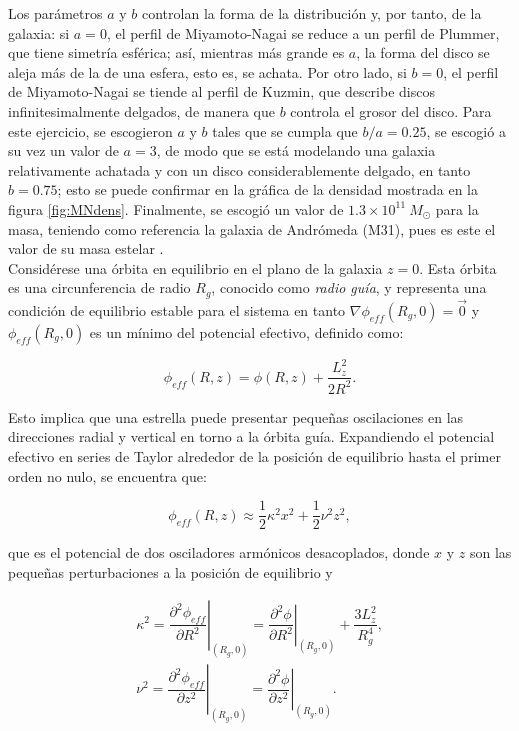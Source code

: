\documentclass[final,5p,times,twocolumn, nopreprintline]{elsarticle}
\numberwithin{equation}{section}
\begin{document}
Los parámetros $a$ y $b$ controlan la forma de la distribución y, por tanto, de la galaxia: si $a=0$, el perfil de Miyamoto-Nagai se reduce a un perfil de Plummer, que tiene simetría esférica; así, mientras más grande es $a$, la forma del disco se aleja más de la de una esfera, esto es, se achata. Por otro lado, si $b=0$, el perfil de Miyamoto-Nagai se tiende al perfil de Kuzmin, que describe discos infinitesimalmente delgados, de manera que $b$ controla el grosor del disco. Para este ejercicio, se escogieron $a$ y $b$ tales que se cumpla que $b/a=0.25$, se escogió a su vez un valor de $a=3$, de modo que se está modelando una galaxia relativamente achatada y con un disco considerablemente delgado, en tanto $b=0.75$; esto se puede confirmar en la gráfica de la densidad mostrada en la figura \ref{fig:MNdens}. Finalmente, se escogió un valor de $1.3\times10^{11}~M_\odot$ para la masa, teniendo como referencia la galaxia de Andrómeda (M31), pues es este el valor de su masa estelar \cite{Corbelli_2010}.\\

Considérese una órbita en equilibrio en el plano de la galaxia $z=0$. Esta órbita es una circunferencia de radio $R_g$, conocido como \emph{radio guía}, y representa una condición de equilibrio estable para el sistema en tanto $\nabla\phi_{eff}(R_g,0)=\vec{0}$ y $\phi_{eff}(R_g,0)$ es un mínimo del potencial efectivo, definido como:

\begin{equation}
\phi_{eff}(R,z)=\phi(R,z)+\dfrac{L_z^2}{2R^2}. \label{eq:poteff}
\end{equation}

Esto implica que una estrella puede presentar pequeñas oscilaciones en las direcciones radial y vertical en torno a la órbita guía. Expandiendo el potencial efectivo en series de Taylor alrededor de la posición de equilibrio hasta el primer orden no nulo, se encuentra que:

\begin{equation}
\phi_{eff}(R,z)\approx \dfrac{1}{2}\kappa^2x^2+\dfrac{1}{2}\nu^2z^2, \label{eq:potOA}
\end{equation}

que es el potencial de dos osciladores armónicos desacoplados, donde $x$ y $z$ son las pequeñas perturbaciones a la posición de equilibrio y 

\begin{align}
\kappa^2=\left.\dfrac{\partial^2\phi_{eff}}{\partial R^2}\right|_{(R_g,0)}=\left.\dfrac{\partial^2\phi}{\partial R^2}\right|_{(R_g,0)}+\dfrac{3L_z^2}{R_g^4}, \label{eq:fepi}\\
\nu^2=\left.\dfrac{\partial^2\phi_{eff}}{\partial z^2}\right|_{(R_g,0)}=\left.\dfrac{\partial^2\phi}{\partial z^2}\right|_{(R_g,0)}. \label{eq:fvert}
\end{align}
\end{document}

